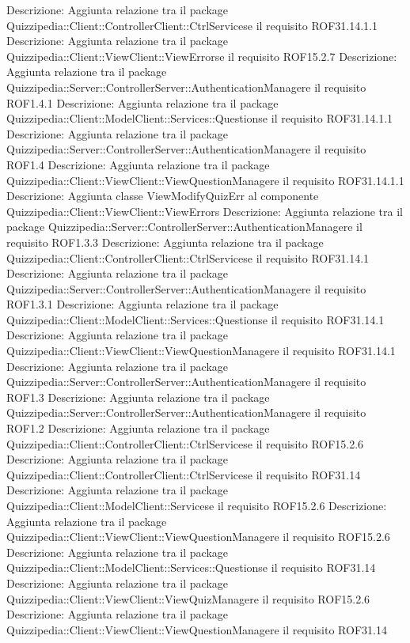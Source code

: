 Descrizione: Aggiunta relazione tra il package Quizzipedia::Client::ControllerClient::CtrlServicese il requisito ROF31.14.1.1 
Descrizione: Aggiunta relazione tra il package Quizzipedia::Client::ViewClient::ViewErrorse il requisito ROF15.2.7 
Descrizione: Aggiunta relazione tra il package Quizzipedia::Server::ControllerServer::AuthenticationManagere il requisito ROF1.4.1 
Descrizione: Aggiunta relazione tra il package Quizzipedia::Client::ModelClient::Services::Questionse il requisito ROF31.14.1.1 
Descrizione: Aggiunta relazione tra il package Quizzipedia::Server::ControllerServer::AuthenticationManagere il requisito ROF1.4 
Descrizione: Aggiunta relazione tra il package Quizzipedia::Client::ViewClient::ViewQuestionManagere il requisito ROF31.14.1.1 
Descrizione: Aggiunta classe ViewModifyQuizErr al componente Quizzipedia::Client::ViewClient::ViewErrors 
Descrizione: Aggiunta relazione tra il package Quizzipedia::Server::ControllerServer::AuthenticationManagere il requisito ROF1.3.3 
Descrizione: Aggiunta relazione tra il package Quizzipedia::Client::ControllerClient::CtrlServicese il requisito ROF31.14.1 
Descrizione: Aggiunta relazione tra il package Quizzipedia::Server::ControllerServer::AuthenticationManagere il requisito ROF1.3.1 
Descrizione: Aggiunta relazione tra il package Quizzipedia::Client::ModelClient::Services::Questionse il requisito ROF31.14.1 
Descrizione: Aggiunta relazione tra il package Quizzipedia::Client::ViewClient::ViewQuestionManagere il requisito ROF31.14.1 
Descrizione: Aggiunta relazione tra il package Quizzipedia::Server::ControllerServer::AuthenticationManagere il requisito ROF1.3 
Descrizione: Aggiunta relazione tra il package Quizzipedia::Server::ControllerServer::AuthenticationManagere il requisito ROF1.2 
Descrizione: Aggiunta relazione tra il package Quizzipedia::Client::ControllerClient::CtrlServicese il requisito ROF15.2.6 
Descrizione: Aggiunta relazione tra il package Quizzipedia::Client::ControllerClient::CtrlServicese il requisito ROF31.14 
Descrizione: Aggiunta relazione tra il package Quizzipedia::Client::ModelClient::Servicese il requisito ROF15.2.6 
Descrizione: Aggiunta relazione tra il package Quizzipedia::Client::ViewClient::ViewQuestionManagere il requisito ROF15.2.6 
Descrizione: Aggiunta relazione tra il package Quizzipedia::Client::ModelClient::Services::Questionse il requisito ROF31.14 
Descrizione: Aggiunta relazione tra il package Quizzipedia::Client::ViewClient::ViewQuizManagere il requisito ROF15.2.6 
Descrizione: Aggiunta relazione tra il package Quizzipedia::Client::ViewClient::ViewQuestionManagere il requisito ROF31.14 
